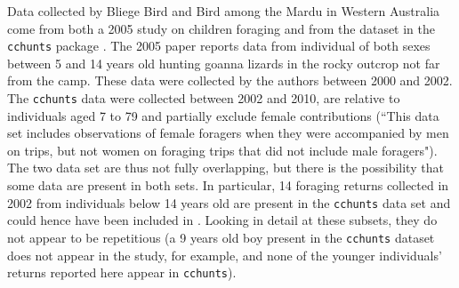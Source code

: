Data collected by Bliege Bird and Bird among the Mardu in Western Australia come from both a 2005 study on children foraging \citep{bird_mardu_2005} and from the dataset in the \texttt{cchunts} package \citep{koster_life_2020}. The 2005 paper reports data from individual of both sexes between 5 and 14 years old hunting goanna lizards in the rocky outcrop not far from the camp. These data were collected by the authors between 2000 and 2002. The \texttt{cchunts} data were collected between 2002 and 2010, are relative to individuals aged 7 to 79 and partially exclude female contributions (``This data set includes observations of female foragers when they were accompanied by men on trips, but not women on foraging trips that did not include male foragers"). The two data set are thus not fully overlapping, but there is the possibility that some data are present in both sets. In particular, 14 foraging returns collected in 2002 from individuals below 14 years old are present in the \texttt{cchunts} data set and could hence have been included in \citet{bird_mardu_2005}. Looking in detail at these subsets, they do not appear to be repetitious (a 9 years old boy present in the \texttt{cchunts} dataset does not appear in the \citet{bird_mardu_2005} study, for example, and none of the younger individuals' returns reported here appear in \texttt{cchunts}). %





